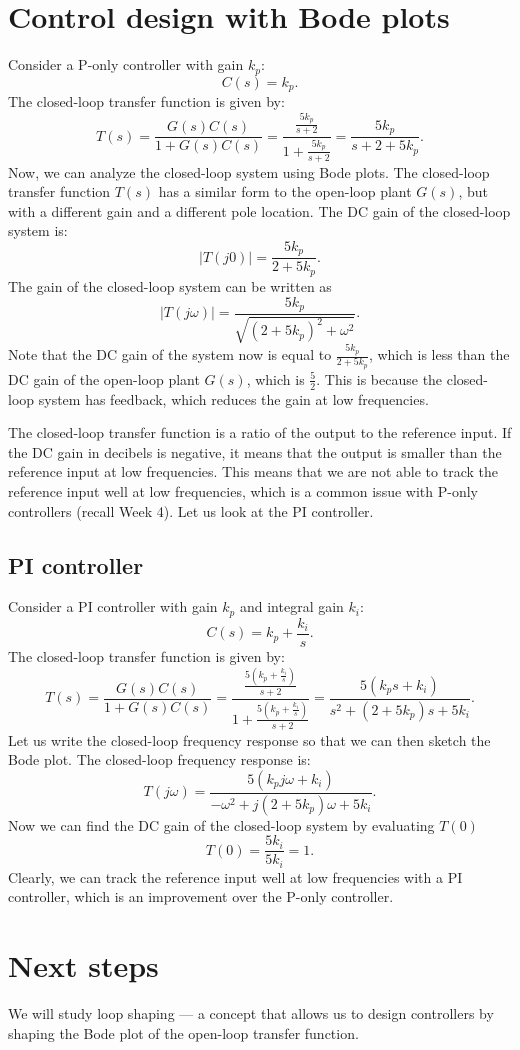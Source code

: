 \documentclass{ee122_notes}
\begin{document}
\section{Control design with Bode plots}
Consider a P-only controller with gain $k_p$:
\[
C(s) = k_p.
\]
The closed-loop transfer function is given by:
\[
T(s) = \frac{G(s)C(s)}{1 + G(s)C(s)} = \frac{\frac{5k_p}{s+2}}{1 + \frac{5k_p}{s+2}} = \frac{5k_p}{s + 2 + 5k_p}.
\]
Now, we can analyze the closed-loop system using Bode plots. The closed-loop transfer function $T(s)$ has a similar form to the open-loop plant $G(s)$, but with a different gain and a different pole location.
The DC gain of the closed-loop system is:
\[
|T(j0)| = \frac{5k_p}{2 + 5k_p}.
\]
The gain of the closed-loop system can be written as 
\[
|T(j\omega)| = \frac{5k_p}{\sqrt{(2 + 5k_p)^2 + \omega^2}}.
\]
Note that the DC gain of the system now is equal to $\frac{5k_p}{2 + 5k_p}$, which is less than the DC gain of the open-loop plant $G(s)$, which is $\frac{5}{2}$. This is because the closed-loop system has feedback, which reduces the gain at low frequencies.

The closed-loop transfer function is a ratio of the output to the reference input. If the DC gain in decibels is negative, it means that the output is smaller than the reference input at low frequencies. This means that we are not able to track the reference input well at low frequencies, which is a common issue with P-only controllers (recall Week 4). Let us look at the PI controller.
\subsection{PI controller}
Consider a PI controller with gain $k_p$ and integral gain $k_i$:
\[
C(s) = k_p + \frac{k_i}{s}.
\]
The closed-loop transfer function is given by:
\[
T(s) = \frac{G(s)C(s)}{1 + G(s)C(s)} = \frac{\frac{5(k_p + \frac{k_i}{s})}{s+2}}{1 + \frac{5(k_p + \frac{k_i}{s})}{s+2}} = \frac{5(k_p s + k_i)}{s^2 + (2 + 5k_p)s + 5k_i}.
\]
Let us write the closed-loop frequency response so that we can then sketch the Bode plot. The closed-loop frequency response is:
\[
T(j\omega) = \frac{5(k_p j\omega + k_i)}{-\omega^2 + j(2 + 5k_p)\omega + 5k_i}.
\]
Now we can find the DC gain of the closed-loop system by evaluating $T(0)$ 
\[
T(0) = \frac{5k_i}{5k_i} = 1.
\]
Clearly, we can track the reference input well at low frequencies with a PI controller, which is an improvement over the P-only controller. 
\section{Next steps}
We will study loop shaping --- a concept that allows us to design controllers by shaping the Bode plot of the open-loop transfer function.
\end{document}
